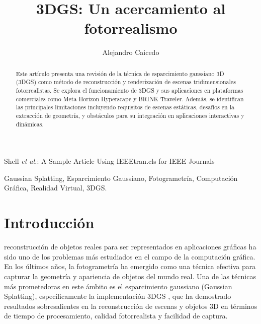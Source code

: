 \documentclass[lettersize,journal]{IEEEtran}
\begin{document}
\title{3DGS: Un acercamiento al fotorrealismo}

\author{Alejandro Caicedo}

%
{Shell \MakeLowercase{\textit{et al.}}: A Sample Article Using IEEEtran.cls for IEEE Journals}

\IEEEpubid{}

\maketitle

\begin{abstract}
Este artículo presenta una revisión de la técnica de esparcimiento gaussiano 3D (3DGS) como método de reconstrucción y renderización de escenas tridimensionales fotorrealistas. Se explora el funcionamiento de 3DGS y sus aplicaciones en plataformas comerciales como Meta Horizon Hyperscape y BRINK Traveler. Además, se identifican las principales limitaciones incluyendo requisitos de escenas estáticas, desafíos en la extracción de geometría, y obstáculos para su integración en aplicaciones interactivas y dinámicas.
\end{abstract}

\begin{IEEEkeywords}
Gaussian Splatting, Esparcimiento Gaussiano, Fotogrametría, Computación Gráfica, Realidad Virtual, 3DGS.
\end{IEEEkeywords}

\section{Introducción}
 reconstrucción de objetos reales para ser representados en aplicaciones gráficas ha sido uno de los problemas más estudiados en el campo de la computación gráfica. En los últimos años, la fotogrametría ha emergido como una técnica efectiva para capturar la geometría y apariencia de objetos del mundo real. Una de las técnicas más prometedoras en este ámbito es el esparcimiento gaussiano (Gaussian Splatting), específicamente la implementación 3DGS \cite{Kerbl2023}, que ha demostrado resultados sobresalientes en la reconstrucción de escenas y objetos 3D \cite{Gudon2024,Cascarano2025,Lian2024} en términos de tiempo de procesamiento, calidad fotorrealista y facilidad de captura.
\end{document}
